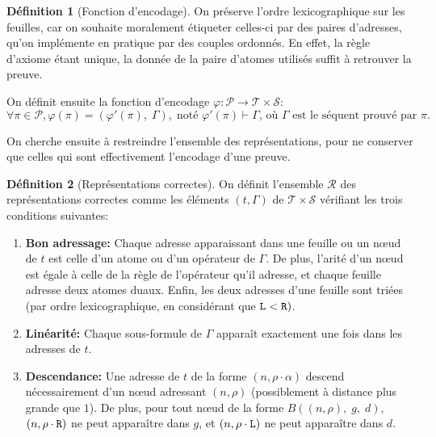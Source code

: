\documentclass[11pt,a4paper]{article}
\theoremstyle{plain}
\theoremstyle{definition}
\newtheorem{definition}{Définition}
\theoremstyle{remark}
\newcommand*{\someadd}{\rho}
\newcommand*{\someproof}{\pi}
\newcommand*{\sequent}{\Gamma}
\newcommand*{\Left}{\textnormal{\texttt{L}}}
\newcommand*{\Right}{\textnormal{\texttt{R}}}
\newcommand*{\proofs}{\ensuremath{\mathcal{P}}}
\newcommand*{\sequents}{\ensuremath{\mathcal{S}}}
\newcommand*{\trees}{\ensuremath{\mathcal{T}}}
\newcommand*{\representationslarge}{\ensuremath{\trees \times \sequents}}
\newcommand*{\representations}{\ensuremath{\mathcal{R}}}
\newcommand*{\encode}{\ensuremath{\varphi}}
\begin{document}
\begin{definition}[Fonction d'encodage]
    On préserve l'ordre lexicographique sur les feuilles, car on souhaite moralement étiqueter celles-ci par des paires d'adresses, qu'on implémente en pratique par des couples ordonnés. En effet, la règle d'axiome étant unique, la donnée de la paire d'atomes utilisés suffit à retrouver la preuve.

    On définit ensuite la fonction d'encodage $\encode : \proofs \rightarrow \representationslarge$:
    \begin{equation*}
    \forall \someproof \in \proofs, \encode \left( \someproof \right) = \left( \encode' \left( \someproof \right), \; \sequent \right), \; \text{noté $\encode' \left( \someproof \right) \vdash \sequent$, où $\sequent$ est le séquent prouvé par $\someproof$.}
    \end{equation*}
\end{definition}

On cherche ensuite à restreindre l'ensemble des représentations, pour ne conserver que celles qui sont effectivement l'encodage d'une preuve.

\begin{definition}[Représentations correctes]
    \label{def_rep}
    On définit l'ensemble \representations{} des représentations correctes comme les éléments $(t, \sequent)$ de $\representationslarge$ vérifiant les trois conditions suivantes:
    
    \begin{enumerate}
    \item\label{cadd} \textbf{Bon adressage:} Chaque adresse apparaissant dans une feuille ou un n\oe ud de $t$ est celle d'un atome ou d'un opérateur de $\sequent$. De plus, l'arité d'un n\oe ud est égale à celle de la règle de l'opérateur qu'il adresse, et chaque feuille adresse deux atomes duaux. Enfin, les deux adresses d'une feuille sont triées (par ordre lexicographique, en considérant que $\Left < \Right)$.
    \item\label{clin} \textbf{Linéarité:} Chaque sous-formule de $\sequent$ apparaît exactement une fois dans les adresses de $t$.
    \item\label{cdes} \textbf{Descendance:} Une adresse de $t$ de la forme $(n, \someadd \cdot \alpha)$ descend nécessairement d'un n\oe ud adressant $(n, \someadd)$ (possiblement à distance plus grande que $1$). De plus, pour tout n\oe ud de la forme $B((n, \someadd), \; g, \; d)$, $(n, \someadd \cdot \Right)$ ne peut apparaître dans $g$, et $(n, \someadd \cdot \Left)$ ne peut apparaître dans $d$.
    \end{enumerate}
\end{definition}
\end{document}

